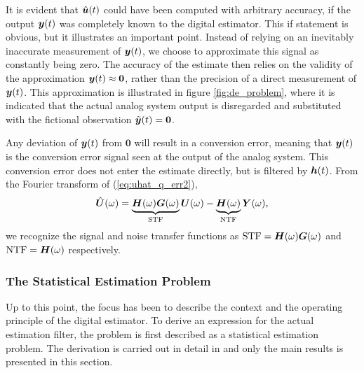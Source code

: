 It is evident that $\hat{\bm{u}}(t)$ could have been computed with arbitrary accuracy, if the output $\bm{y}(t)$ was completely known to the digital estimator. This if statement is obvious, but it illustrates an important point. Instead of relying on an inevitably inaccurate measurement of $\bm{y}(t)$, we choose to approximate this signal as constantly being zero. The accuracy of the estimate then relies on the validity of the approximation $\bm{y}(t) \approx \bm{0}$, rather than the precision of a direct measurement of $\bm{y}(t)$. This approximation is illustrated in figure \ref{fig:de_problem}, where it is indicated that the actual analog system output is disregarded and substituted with the fictional observation $\tilde{\bm{y}}(t) = \bm{0}$.

Any deviation of $\bm{y}(t)$ from $\bm{0}$ will result in a conversion error, meaning that $\bm{y}(t)$ is the conversion error signal seen at the output of the analog system. This conversion error does not enter the estimate directly, but is filtered by $\bm{h}(t)$. From the Fourier transform of (\ref{eq:uhat_q_err2}),
\begin{equation}
    \label{eq:F_uhat_err2}
    \hat{\bm{U}}(\omega) =  \underbrace{\bm{H}(\omega) \bm{G}(\omega)}_\text{STF}\bm{U}(\omega) - \underbrace{\bm{H}(\omega)}_\text{NTF}\bm{Y}(\omega),
\end{equation}
we recognize the signal and noise transfer functions as $\text{STF} = \bm{H}(\omega) \bm{G}(\omega)$ and $\text{NTF} = \bm{H}(\omega)$ respectively.

\subsubsection*{The Statistical Estimation Problem}
Up to this point, the focus has been to describe the context and the operating principle of the digital estimator. To derive an expression for the actual estimation filter, the problem is first described as a statistical estimation problem. The derivation is carried out in detail in \cite{malmberg_thesis} and only the main results is presented in this section.


